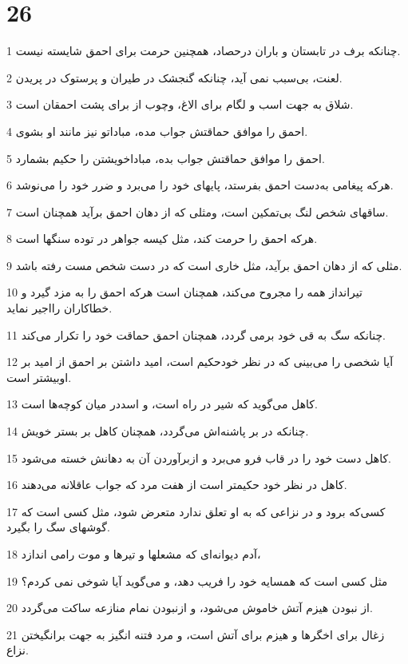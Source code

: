 \chapter{26}

\par 1 چنانکه برف در تابستان و باران درحصاد، همچنین حرمت برای احمق شایسته نیست.
\par 2 لعنت، بی‌سبب نمی آید، چنانکه گنجشک در طیران و پرستوک در پریدن.
\par 3 شلاق به جهت اسب و لگام برای الاغ، وچوب از برای پشت احمقان است.
\par 4 احمق را موافق حماقتش جواب مده، مباداتو نیز مانند او بشوی.
\par 5 احمق را موافق حماقتش جواب بده، مباداخویشتن را حکیم بشمارد.
\par 6 هر‌که پیغامی به‌دست احمق بفرستد، پایهای خود را می‌برد و ضرر خود را می‌نوشد.
\par 7 ساقهای شخص لنگ بی‌تمکین است، ومثلی که از دهان احمق برآید همچنان است.
\par 8 هر‌که احمق را حرمت کند، مثل کیسه جواهر در توده سنگها است.
\par 9 مثلی که از دهان احمق برآید، مثل خاری است که در دست شخص مست رفته باشد.
\par 10 تیرانداز همه را مجروح می‌کند، همچنان است هر‌که احمق را به مزد گیرد و خطاکاران رااجیر نماید.
\par 11 چنانکه سگ به قی خود برمی گردد، همچنان احمق حماقت خود را تکرار می‌کند.
\par 12 آیا شخصی را می‌بینی که در نظر خودحکیم است، امید داشتن بر احمق از امید بر اوبیشتر است.
\par 13 کاهل می‌گوید که شیر در راه است، و اسددر میان کوچه‌ها است.
\par 14 چنانکه در بر پاشنه‌اش می‌گردد، همچنان کاهل بر بستر خویش.
\par 15 کاهل دست خود را در قاب فرو می‌برد و ازبرآوردن آن به دهانش خسته می‌شود.
\par 16 کاهل در نظر خود حکیمتر است از هفت مرد که جواب عاقلانه می‌دهند.
\par 17 کسی‌که برود و در نزاعی که به او تعلق ندارد متعرض شود، مثل کسی است که گوشهای سگ را بگیرد.
\par 18 آدم دیوانه‌ای که مشعلها و تیرها و موت رامی اندازد،
\par 19 مثل کسی است که همسایه خود را فریب دهد، و می‌گوید آیا شوخی نمی کردم؟
\par 20 از نبودن هیزم آتش خاموش می‌شود، و ازنبودن نمام منازعه ساکت می‌گردد.
\par 21 زغال برای اخگرها و هیزم برای آتش است، و مرد فتنه انگیز به جهت برانگیختن نزاع.
